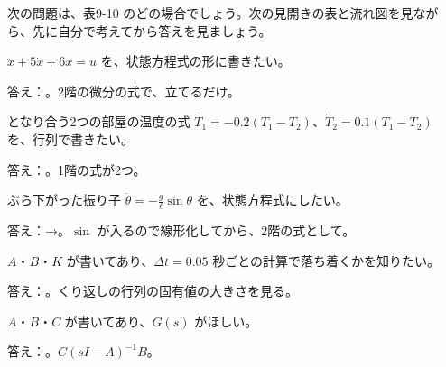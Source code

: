 次の問題は、表9-10 のどの場合でしょう。次の見開きの表と流れ図を見ながら、先に自分で考えてから答えを見ましょう。
\begin{enumerate}[label={\bkcircled[\bkTT]{\arabic*}}, leftmargin=2.4\zw, itemsep=3pt, topsep=2pt]
\item $\ddot x+5\dot x+6x=u$ を、状態方程式の形に書きたい。\par\nobreak\noindent 答え：。2階の微分の式で、立てるだけ。
\item となり合う2つの部屋の温度の式 $\dot T_1=-0.2(T_1-T_2)$、$\dot T_2=0.1(T_1-T_2)$ を、行列で書きたい。\par\nobreak\noindent 答え：。1階の式が2つ。
\item ぶら下がった振り子 $\ddot\theta=-\frac{g}{\ell}\sin\theta$ を、状態方程式にしたい。\par\nobreak\noindent 答え：→。$\sin$ が入るので線形化してから、2階の式として。
\item $A$・$B$・$K$ が書いてあり、$\Delta t=0.05$ 秒ごとの計算で落ち着くかを知りたい。\par\nobreak\noindent 答え：。くり返しの行列の固有値の大きさを見る。
\item $A$・$B$・$C$ が書いてあり、$G(s)$ がほしい。\par\nobreak\noindent 答え：。$C(sI-A)^{-1}B$。
\end{enumerate}

